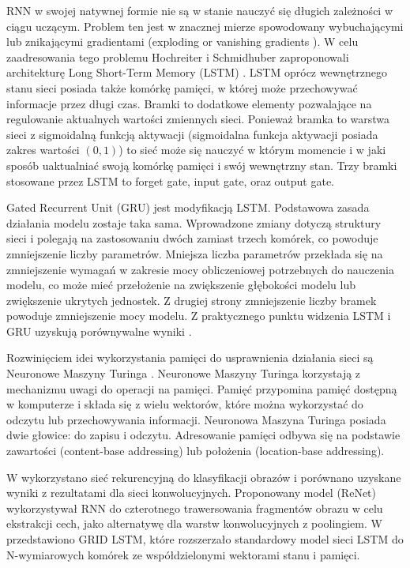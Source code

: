 \documentclass[oneside, mag]{mgr}
\begin{document}
RNN w swojej natywnej formie nie są w stanie nauczyć się długich zależności w ciągu uczącym. Problem ten jest w znacznej mierze spowodowany wybuchającymi lub znikającymi gradientami (exploding or vanishing gradients \cite{vanishing_gradient_RNN}). W celu zaadresowania tego problemu Hochreiter i Schmidhuber zaproponowali architekturę Long Short-Term Memory (LSTM) \cite{LSTM}. LSTM oprócz wewnętrznego stanu sieci posiada także komórkę pamięci, w której może przechowywać informacje przez długi czas. Bramki to dodatkowe elementy pozwalające na regulowanie aktualnych wartości zmiennych sieci. Ponieważ bramka to warstwa sieci z sigmoidalną funkcją aktywacji (sigmoidalna funkcja aktywacji posiada zakres wartości $(0,1)$) to sieć może się nauczyć w którym momencie i w jaki sposób uaktualniać swoją komórkę pamięci i swój wewnętrzny stan. Trzy bramki stosowane przez LSTM to forget gate, input gate, oraz output gate.  

Gated Recurrent Unit (GRU) \cite{DBLP:journals/corr/ChungGCB15} jest modyfikacją LSTM. Podstawowa zasada działania modelu zostaje taka sama. Wprowadzone zmiany dotyczą struktury sieci i polegają na zastosowaniu dwóch zamiast trzech komórek, co powoduje zmniejszenie liczby parametrów. Mniejsza liczba parametrów przekłada się na zmniejszenie wymagań w zakresie mocy obliczeniowej potrzebnych do nauczenia modelu, co może mieć przełożenie na zwiększenie głębokości modelu lub zwiększenie ukrytych jednostek. Z drugiej strony zmniejszenie liczby bramek powoduje zmniejszenie mocy modelu. Z praktycznego punktu widzenia LSTM i GRU uzyskują porównywalne wyniki \cite{DBLP:journals/corr/ChungGCB14}.

Rozwinięciem idei wykorzystania pamięci do usprawnienia działania sieci są Neuronowe Maszyny Turinga \cite{DBLP:journals/corr/GravesWD14}. Neuronowe Maszyny Turinga korzystają z mechanizmu uwagi do operacji na pamięci. Pamięć przypomina pamięć dostępną w komputerze i składa się z wielu wektorów, które można wykorzystać do odczytu lub przechowywania informacji. Neuronowa Maszyna Turinga posiada dwie głowice: do zapisu i odczytu. Adresowanie pamięci odbywa się na podstawie zawartości (content-base addressing) lub położenia (location-base addressing).

W \cite{DBLP:journals/corr/VisinKCMCB15} wykorzystano sieć rekurencyjną do klasyfikacji obrazów i porównano uzyskane wyniki z rezultatami dla sieci konwolucyjnych. Proponowany model (ReNet) wykorzystywał RNN do czterotnego trawersowania fragmentów obrazu w celu ekstrakcji cech, jako alternatywę dla warstw konwolucyjnych z poolingiem. W \cite{DBLP:journals/corr/KalchbrennerDG15} przedstawiono GRID LSTM, które rozszerzało standardowy model sieci LSTM do N-wymiarowych komórek ze współdzielonymi wektorami stanu i pamięci.
\end{document}
